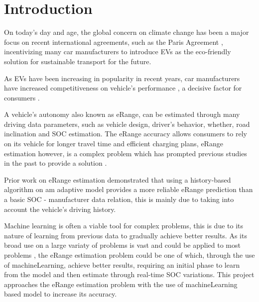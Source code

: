 \chapter{Introduction}
\label{cha:introduction}

On today's day and age, the global concern on climate
change has been a major focus on recent international agreements,
such as the Paris Agreement \citep{parisAgreement},
incentivizing many car manufacturers to introduce
\gls{EVs} as the eco-friendly
solution for sustainable transport for the future.


As \gls{EVs} have been increasing in popularity in
recent years, car manufacturers have
increased competitiveness on vehicle's performance
\citep{evCompetitiveness}, a decisive factor 
for consumers \citep{EGBUE2012717}.


A vehicle's autonomy also known as \gls{eRange},
can be estimated through many driving data parameters,
such as vehicle design, driver's behavior, whether,
road inclination and \gls{SOC} estimation.
The \gls{eRange} accuracy allows consumers to rely
on its vehicle for longer travel time and efficient
charging plans, \gls{eRange} estimation
however, is a complex problem which has prompted
previous studies in the past to provide a solution 
\citep{classicEVX, predictionOfeRange}.

\vbox {
    Prior work \citep{classicEVX} on \gls{eRange}
    estimation demonstrated that using a
    history-based algorithm on am adaptive model
    provides a more reliable \gls{eRange} prediction
    than a basic \gls{SOC} - manufacturer data relation,
    this is mainly due to taking into account the
    vehicle's driving history.
}

Machine learning is often a viable tool for complex
problems, this is due to its nature of 
learning from previous data to 
gradually achieve better results.
As its broad use on a large variaty of problems 
is vast and could be applied to most problems
\citep{mitchelllearning}, the \gls{eRange}
 estimation problem could be one of which, 
through the use of \gls{machineLearning}, 
achieve better results, requiring an initial
phase to learn from the model and then estimate
through real-time \gls{SOC} variations.
This project approaches the \gls{eRange} estimation
problem with the use of \gls{machineLearning} based
model to increase its accuracy.

